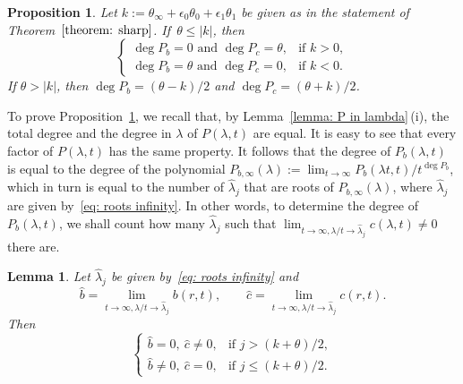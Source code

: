 \documentclass[pdftex]{sigma}
\numberwithin{equation}{section}
\newtheorem{Lemma}[Theorem]{Lemma}
\newtheorem{Proposition}[Theorem]{Proposition}
\begin{document}
\begin{Proposition} \label{prop: degree of Pb}
 Let $k:=\theta_\infty+\epsilon_0\theta_0+\epsilon_1\theta_1$ be
 given as in the statement of Theorem~$\ref{theorem: sharp}$.
 If~$\theta\le|k|$, then
\[
 \begin{cases}
 \deg P_b=0\text{ and }\deg P_c=\theta, &\text{if }k>0, \\
 \deg P_b=\theta\text{ and }\deg P_c=0, &\text{if }k<0.
 \end{cases}
\]
 If $\theta>|k|$, then $\deg P_b=(\theta-k)/2$ and $\deg
 P_c=(\theta+k)/2$.
\end{Proposition}

To prove Proposition~\ref{prop: degree of Pb}, we recall that, by
Lemma~\ref{lemma: P in lambda}\,(i), the total degree and the degree in
$\lambda$ of $P(\lambda,t)$ are equal. It is easy to see that every
factor of $P(\lambda,t)$ has the same property. It follows that the
degree of $P_b(\lambda,t)$ is equal to the degree of the polynomial
$P_{b,\infty}(\lambda):=\lim_{t\to\infty}P_b(\lambda t,t)/t^{\deg
 P_b}$, which in turn is equal to the number of $\hat\lambda_j$ that
are roots of $P_{b,\infty}(\lambda)$, where $\hat\lambda_j$ are given
by~\eqref{eq: roots infinity}. In other words, to determine the degree
of $P_b(\lambda,t)$, we shall count how many $\hat\lambda_j$ such that
$\lim_{t\to\infty,\lambda/t\to\hat\lambda_j}c(\lambda,t)\neq 0$ there
are.

\begin{Lemma}\label{lem-111} Let $\hat\lambda_j$ be given by~\eqref{eq: roots
 infinity} and
\[
 \hat b=\lim_{t\to\infty,\lambda/t\to\hat\lambda_j}b(r,t), \qquad
 \hat c=\lim_{t\to\infty,\lambda/t\to\hat\lambda_j}c(r,t).
\]
 Then
\[
 \begin{cases}
 \hat b=0,~\hat c\neq 0, & \text{if }j>(k+\theta)/2, \\
 \hat b\neq0,~\hat c=0, &\text{if }j\le(k+\theta)/2.
 \end{cases}
\]
\end{Lemma}
\end{document}
